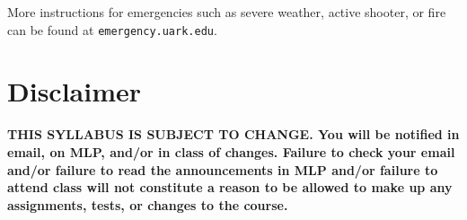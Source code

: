 \documentclass[margin,line,pifont,palatino,courier]{res}
\begin{document}
\begin{resume}
More instructions for emergencies such as severe weather, active shooter, or fire can be found at \verb+emergency.uark.edu+.   

\section{\sc Disclaimer} {\bf THIS SYLLABUS IS SUBJECT TO CHANGE. You will be notified in email, on MLP, and/or in class of changes. Failure to check your email and/or failure to read the announcements in MLP and/or failure to attend class will not constitute a reason to be allowed to make up any assignments, tests, or changes to the course.}

\end{resume}
\end{document}
